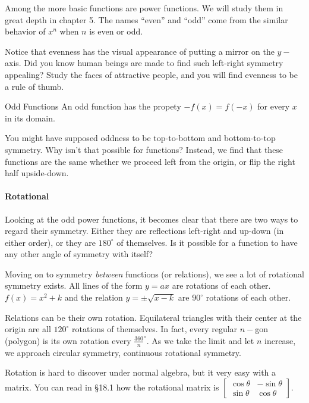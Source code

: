 Among the more basic functions are power functions.  We will study them in great depth in
chapter 5.  The names ``even'' and ``odd'' come from the similar behavior of $x^n$ when
$n$ is even or odd.

Notice that evenness has the visual appearance of putting a mirror on the $y-$axis.  Did you 
know human beings are made to find such left-right symmetry appealing?  Study the faces of
attractive people, and you will find evenness to be a rule of thumb. 



\begin{derivation}{Odd Functions}
An odd function has the propety $-f(x)=f(-x)$ for every $x$ in its domain.
\end{derivation}


You might have supposed oddness to be top-to-bottom and bottom-to-top symmetry.  Why isn't
that possible for functions?  Instead, we find that these functions are the same whether we 
proceed left from the origin, or flip the right half upside-down.


\paragraph{Rotational}
Looking at the odd power functions, it becomes clear that there are two ways to regard their
symmetry.  Either they are reflections left-right and up-down (in either order), or they are
$180^\circ$ of themselves.  Is it possible for a function to have any other angle of symmetry
with itself?

Moving on to symmetry \emph{between} functions (or relations), we see a lot of rotational
symmetry exists.  All lines of the form $y=ax$ are rotations of each other.  $f(x)=x^2+k$ and
the relation $y=\pm\sqrt{x-k}$ are $90^\circ$ rotations of each other.

Relations can be their own rotation.  Equilateral triangles with their center at the origin are 
all $120^\circ$ rotations of themselves.  In fact, every regular $n-$gon (polygon) is its
own rotation every $\frac{360}{n}^\circ$.  As we take the limit and let $n$ increase,
we approach circular symmetry, continuous rotational symmetry.

Rotation is hard to discover under normal algebra, but it very easy with a matrix.
You can read in §18.1 how the rotational matrix is 
$\begin{bmatrix} 
	\cos { \theta  }  & -\sin { \theta  }  \\ 
	\sin { \theta  }  & \cos { \theta  }  
\end{bmatrix}$.



